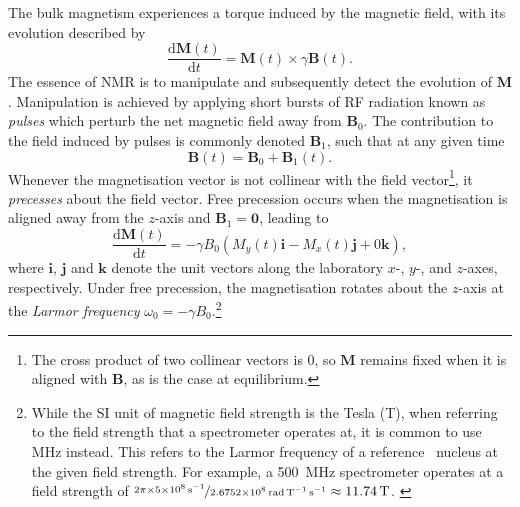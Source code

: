 The bulk magnetism experiences a torque induced by the magnetic field, with its
evolution described by
\begin{equation}
  \frac{\mathrm{d}\symbf{M}(t)}{\mathrm{d}t} = \symbf{M}(t) \times \gamma \symbf{B}(t).
  \label{eq:M-cross-B}
\end{equation}
The essence of \ac{NMR} is to manipulate and subsequently detect the evolution
of $\symbf{M}$. Manipulation is achieved by applying short bursts of \ac{RF}
radiation known as \emph{pulses} which perturb the net magnetic field away from
$\symbf{B}_0$. The contribution to the field induced by pulses is commonly
denoted $\symbf{B}_1$, such that at any given time
\begin{equation}
    \symbf{B}(t) = \symbf{B}_0 + \symbf{B}_1(t).
\end{equation}
Whenever the magnetisation vector is not collinear with the field vector\footnote{
    The cross product of two collinear vectors is $0$, so $\symbf{M}$ remains
    fixed when it is aligned with $\symbf{B}$, as is the case at equilibrium.
}, it
\emph{precesses} about the field vector. Free precession occurs
when the magnetisation is aligned away from the $z$-axis and $\symbf{B}_1 =
\symbf{0}$, leading to
\begin{equation}
  \frac{\mathrm{d}\symbf{M}(t)}{\mathrm{d}t} =
  -\gamma B_0 ( M_y(t) \symbf{i} -M_x(t) \symbf{j} + 0 \symbf{k}),
\end{equation}
where $\symbf{i}$, $\symbf{j}$ and $\symbf{k}$ denote the unit vectors along
the laboratory $x$-, $y$-, and $z$-axes, respectively.
Under free precession, the magnetisation rotates about the $z$-axis at the
\emph{Larmor frequency} $\omega_0 = -\gamma B_0$.\footnote{
    While the \ac{SI} unit of magnetic field strength is the Tesla
    (\unit{\tesla}), when referring to the field strength that a spectrometer
    operates at, it is common to use \unit{\mega\hertz} instead. This refers to
    the Larmor frequency of a reference \proton\ nucleus at the
    given field strength. For example, a \qty{500}{\mega\hertz} spectrometer
    operates at a field strength of
    $\nicefrac{2 \pi \times \qty{5e8}{\per\second}}{\qty{2.6752e8}{\radian\per\tesla\per\second}}
    \approx \qty{11.74}{\tesla}$.
    \label{fn:MHz}
}

